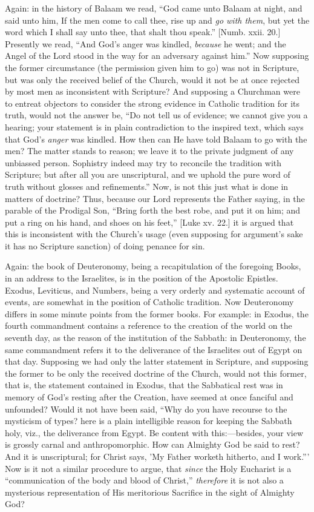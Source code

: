 Again: in the history of Balaam we read, ``God came unto Balaam
at night, and said unto him, If the men come to call thee, rise up and
\emph{go with them}, but yet the word which I shall say unto thee,
that shalt thou speak.'' [Numb. xxii. 20.] Presently we read,
``And God's anger was kindled, \emph{because} he went; and the
Angel of the Lord stood in the way for an adversary against him.''
Now supposing the former circumstance (the permission given him to go)
was not in Scripture, but was only the received belief of the Church,
would it not be at once rejected by most men as inconsistent
with Scripture? And supposing a Churchman were to entreat objectors to
consider the strong evidence in Catholic tradition for its truth,
would not the answer be, ``Do not tell us of evidence; we cannot
give you a hearing; your statement is in plain contradiction to the
inspired text, which says that God's \emph{anger} was kindled. How then can
He have told Balaam to go with the men? The matter stands to reason;
we leave it to the private judgment of any unbiassed person. Sophistry
indeed may try to reconcile the tradition with Scripture; but after
all you are unscriptural, and we uphold the pure word of truth without
glosses and refinements.'' Now, is not this just what is done in
matters of doctrine? Thus, because our Lord represents the Father
saying, in the parable of the Prodigal Son, ``Bring forth the best
robe, and put it on him; and put a ring on his hand, and shoes on his
feet,'' [Luke xv. 22.] it is argued that this is inconsistent with
the Church's usage (even supposing for argument's sake it has no
Scripture sanction) of doing penance for sin.

Again: the book of Deuteronomy, being a recapitulation of the
foregoing Books, in an address to the Israelites, is in the position
of the Apostolic Epistles. Exodus, Leviticus, and Numbers, being a
very orderly and systematic account of events, are somewhat in the
position of Catholic tradition. Now Deuteronomy differs in some minute
points from the former books. For example: in Exodus, the fourth
commandment contains a reference to the creation of the world on the
seventh day, as the reason of the institution of the Sabbath: in
Deuteronomy, the same commandment refers it to the deliverance of the
Israelites out of Egypt on that day. Supposing we had only the
latter statement in Scripture, and supposing the former to be only the
received doctrine of the Church, would not this former, that is, the
statement contained in Exodus, that the Sabbatical rest was in memory
of God's resting after the Creation, have seemed at once fanciful and
unfounded? Would it not have been said, ``Why do you have recourse
to the mysticism of types? here is a plain intelligible reason for
keeping the Sabbath holy, viz., the deliverance from Egypt. Be content
with this:—besides, your view is grossly carnal and anthropomorphic.
How can Almighty God be said to rest? And it is unscriptural; for
Christ says, 'My Father worketh hitherto, and I work.''' Now is it
not a similar procedure to argue, that \emph{since} the Holy Eucharist
is a ``communication of the body and blood of Christ,'' \emph{therefore}
it is not also a mysterious representation of His meritorious
Sacrifice in the sight of Almighty God?

